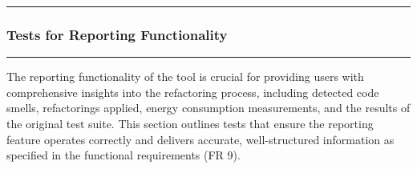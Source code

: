 \documentclass[12pt, titlepage]{article}
\newcommand{\colorrule}{\textcolor{BlueViolet}{\rule{\linewidth}{2pt}}}
\begin{document}
\noindent
\colorrule

\subsubsection{Tests for Reporting Functionality}
\colorrule

\medskip

\noindent
The reporting functionality of the tool is crucial for providing users with comprehensive insights into the refactoring process, including detected code smells, refactorings applied, energy consumption measurements, and the results of the original test suite. This section outlines tests that ensure the reporting feature operates correctly and delivers accurate, well-structured information as specified in the functional requirements (FR 9). 
		
\end{document}
